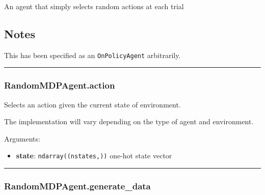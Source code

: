 \begin{Shaded}
\begin{Highlighting}[]
\end{Highlighting}
\end{Shaded}

An agent that simply selects random actions at each trial

\subsection{Notes}\label{notes}

This has been specified as an \texttt{OnPolicyAgent} arbitrarily.

\begin{center}\rule{0.5\linewidth}{\linethickness}\end{center}

\subsubsection{RandomMDPAgent.action}\label{randommdpagent.action}

\begin{Shaded}
\begin{Highlighting}[]
\end{Highlighting}
\end{Shaded}

Selects an action given the current state of environment.

The implementation will vary depending on the type of agent and
environment.

Arguments:

\begin{itemize}
\tightlist
\item
  \textbf{state}: \texttt{ndarray((nstates,))} one-hot state vector
\end{itemize}

\begin{center}\rule{0.5\linewidth}{\linethickness}\end{center}

\subsubsection{RandomMDPAgent.generate\_data}\label{randommdpagent.generate_data}

\begin{Shaded}
\begin{Highlighting}[]
\OperatorTok{=}\NormalTok{)}
\end{Highlighting}
\end{Shaded}

